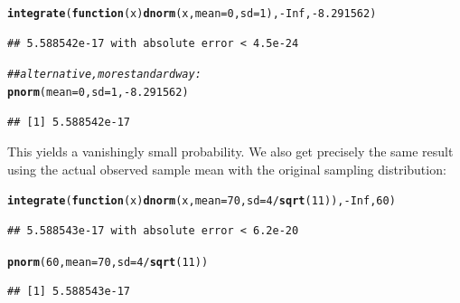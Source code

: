 \documentclass[12pt]{book}\usepackage[]{graphicx}\usepackage[]{color}
\makeatletter
\newcommand{\hlnum}[1]{\textcolor[rgb]{0.686,0.059,0.569}{#1}}%
\newcommand{\hlcom}[1]{\textcolor[rgb]{0.678,0.584,0.686}{\textit{#1}}}%
\newcommand{\hlopt}[1]{\textcolor[rgb]{0,0,0}{#1}}%
\newcommand{\hlstd}[1]{\textcolor[rgb]{0.345,0.345,0.345}{#1}}%
\newcommand{\hlkwa}[1]{\textcolor[rgb]{0.161,0.373,0.58}{\textbf{#1}}}%
\newcommand{\hlkwc}[1]{\textcolor[rgb]{0.333,0.667,0.333}{#1}}%
\newcommand{\hlkwd}[1]{\textcolor[rgb]{0.737,0.353,0.396}{\textbf{#1}}}%
\newenvironment{kframe}{%
 \def\at@end@of@kframe{}%
 \ifinner\ifhmode%
  \def\at@end@of@kframe{\end{minipage}}%
  \begin{minipage}{\columnwidth}%
 \fi\fi%
 \def\FrameCommand##1{\hskip\@totalleftmargin \hskip-\fboxsep
 \colorbox{shadecolor}{##1}\hskip-\fboxsep
     \hskip-\linewidth \hskip-\@totalleftmargin \hskip\columnwidth}%
 \MakeFramed {\advance\hsize-\width
   \@totalleftmargin\z@ \linewidth\hsize
   \@setminipage}}%
 {\par\unskip\endMakeFramed%
 \at@end@of@kframe}
\newenvironment{knitrout}{}{} %
\makeatother
\begin{document}
\begin{knitrout}
\color{fgcolor}\begin{kframe}
\begin{alltt}
\hlkwd{integrate}\hlstd{(}\hlkwa{function}\hlstd{(}\hlkwc{x}\hlstd{)} \hlkwd{dnorm}\hlstd{(x,} \hlkwc{mean} \hlstd{=} \hlnum{0}\hlstd{,} \hlkwc{sd} \hlstd{=} \hlnum{1}\hlstd{),} \hlopt{-}\hlnum{Inf}\hlstd{,} \hlopt{-}\hlnum{8.291562}\hlstd{)}
\end{alltt}
\begin{verbatim}
## 5.588542e-17 with absolute error < 4.5e-24
\end{verbatim}
\begin{alltt}
\hlcom{## alternative, more standard way:}
\hlkwd{pnorm}\hlstd{(}\hlkwc{mean}\hlstd{=}\hlnum{0}\hlstd{,}\hlkwc{sd}\hlstd{=}\hlnum{1}\hlstd{,}\hlopt{-}\hlnum{8.291562}\hlstd{)}
\end{alltt}
\begin{verbatim}
## [1] 5.588542e-17
\end{verbatim}
\end{kframe}
\end{knitrout}

This yields a vanishingly small probability. We also get precisely the same result using the actual observed sample mean with the original sampling distribution:

\begin{knitrout}
\color{fgcolor}\begin{kframe}
\begin{alltt}
\hlkwd{integrate}\hlstd{(}\hlkwa{function}\hlstd{(}\hlkwc{x}\hlstd{)} \hlkwd{dnorm}\hlstd{(x,} \hlkwc{mean} \hlstd{=} \hlnum{70}\hlstd{,} \hlkwc{sd} \hlstd{=} \hlnum{4}\hlopt{/}\hlkwd{sqrt}\hlstd{(}\hlnum{11}\hlstd{)),} \hlopt{-}\hlnum{Inf}\hlstd{,} \hlnum{60}\hlstd{)}
\end{alltt}
\begin{verbatim}
## 5.588543e-17 with absolute error < 6.2e-20
\end{verbatim}
\begin{alltt}
\hlkwd{pnorm}\hlstd{(}\hlnum{60}\hlstd{,}\hlkwc{mean}\hlstd{=}\hlnum{70}\hlstd{,}\hlkwc{sd}\hlstd{=}\hlnum{4}\hlopt{/}\hlkwd{sqrt}\hlstd{(}\hlnum{11}\hlstd{))}
\end{alltt}
\begin{verbatim}
## [1] 5.588543e-17
\end{verbatim}
\end{kframe}
\end{knitrout}
\end{document}
